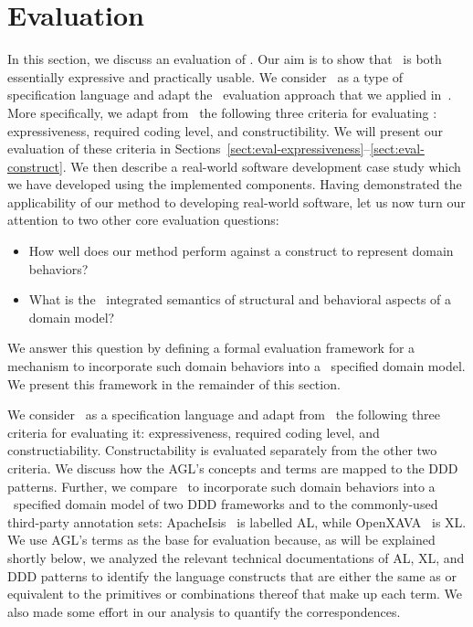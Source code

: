 \section{Evaluation}
\label{sect:evaluation} %

In this section, we discuss an evaluation of \agl. Our aim is to show that \agl~is both  essentially expressive and practically usable.
%
%
We consider \agl~as a type of specification language and adapt the \dcsl~evaluation approach that we applied in~\cite{le_domain_2018}.
%
More specifically, we adapt from~\cite{lamsweerde_formal_2000} the following three criteria for evaluating \agl: expressiveness, required coding level, and constructibility. We will present our evaluation of these criteria in Sections~\ref{sect:eval-expressiveness}--\ref{sect:eval-construct}. We then describe a real-world software development case study which we have developed using the implemented components. Having demonstrated the applicability of our method to developing real-world software, let us now turn our attention to two other core evaluation questions:
\begin{itemize}
	\item How well does our method perform against a construct to represent domain behaviors?
	\item What is the \agl~integrated semantics of structural and behavioral aspects of a domain model?
\end{itemize}
We answer this question by defining a formal evaluation framework for a mechanism to incorporate such domain behaviors into a \dcsl~specified domain model. We present this framework in the remainder of this section. 

We consider \agl~as a specification language and adapt from \cite{thakur2019role}~the following three criteria for evaluating it: expressiveness, required coding level, and constructiability. Constructability is evaluated separately from the other two criteria. We discuss how the AGL’s concepts and terms are mapped to the DDD patterns. Further, we compare \agl~to incorporate such domain behaviors into a \dcsl~specified domain model of two DDD frameworks and to the commonly-used third-party annotation sets: ApacheIsis \cite{haywood2013apache}~is labelled AL, while OpenXAVA \cite{aprende_OpenXava_2011}~is XL.
We use AGL’s terms as the base for evaluation because, as will be explained shortly below, we analyzed the relevant technical documentations of AL, XL, and DDD patterns to identify the language constructs that are either the same as or equivalent to the primitives or combinations thereof that make up each term. We also made some effort in our analysis to quantify the correspondences.

